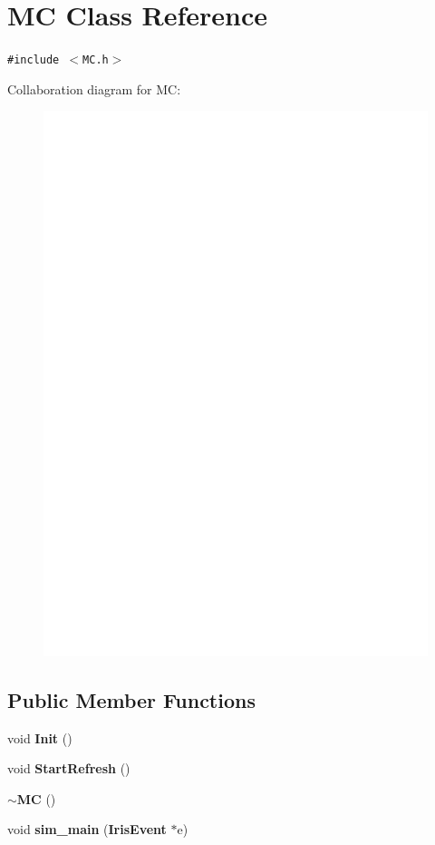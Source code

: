 \section{MC Class Reference}
\label{classMC}
{\tt \#include $<$MC.h$>$}

Collaboration diagram for MC:\nopagebreak
\begin{figure}[H]
\begin{center}
\leavevmode
\includegraphics[width=400pt]{classMC__coll__graph}
\end{center}
\end{figure}
\subsection*{Public Member Functions}
\begin{CompactItemize}
\item 
void {\bf Init} ()
\item 
void {\bf StartRefresh} ()
\item 
{\bf $\sim$MC} ()
\item 
void {\bf sim\_\-main} ({\bf IrisEvent} $\ast$e)
\end{CompactItemize}
